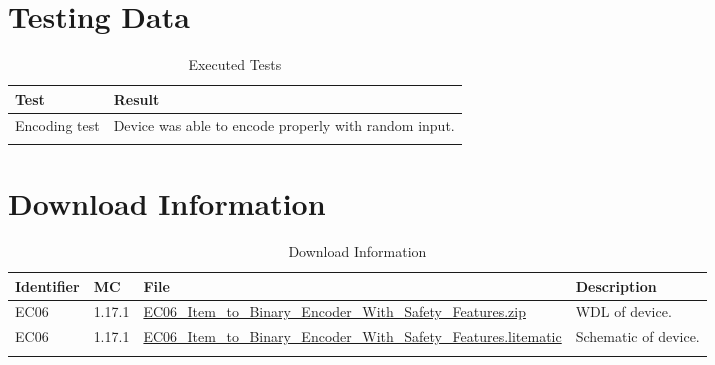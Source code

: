 \documentclass[10pt]{datasheet}
\begin{document}
\section{Testing Data}
\begin{table}[h]
\caption{Executed Tests}
\begin{tabularx}{\textwidth}{l | X}
    \thickhline
    \textbf{Test} & \textbf{Result} \\
    \hline
    Encoding test & Device was able to encode properly with random input. \\
    \thickhline
\end{tabularx}
\end{table}

\section{Download Information}
\begin{table}[h]
    \caption{Download Information}
    \begin{tabularx}{\textwidth}{l | l | l | X}
        \thickhline
        \textbf{Identifier} & \textbf{MC} & \textbf{File} & \textbf{Description} \\
        \hline
        EC06 & 1.17.1 & \href{https://github.com/Soontech-Annals/Archive/blob/b56572c0d2b4f182d9e9d41449d8cb2963b923ae/Archive/encoders/EC06\%20Item\%20to\%20Binary\%20Encoder\%20With\%20Safety\%20Features/EC06\_Item\_to\_Binary\_Encoder\_With\_Safety\_Features.zip?raw=1}{EC06\_Item\_to\_Binary\_Encoder\_With\_Safety\_Features.zip} & WDL of device. \\
        \hline
        EC06 & 1.17.1 & \href{https://github.com/Soontech-Annals/Archive/blob/b56572c0d2b4f182d9e9d41449d8cb2963b923ae/Archive/encoders/EC06\%20Item\%20to\%20Binary\%20Encoder\%20With\%20Safety\%20Features/EC06\_Item\_to\_Binary\_Encoder\_With\_Safety\_Features.litematic?raw=1}{EC06\_Item\_to\_Binary\_Encoder\_With\_Safety\_Features.litematic} & Schematic of device. \\
        \hline
        \thickhline
    \end{tabularx}
\end{table}
\end{document}
